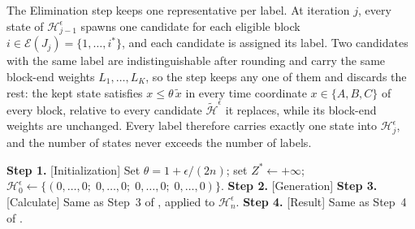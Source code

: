\documentclass[12pt]{article}
\begin{document}
\begin{sloppypar}
The Elimination step keeps one representative per label. At iteration $j$, every state of
$\mathscr{H}^{\epsilon}_{j-1}$ spawns one candidate for each eligible block
$i\in\mathcal{E}(J_j)=\{1,\dots,i^{*}\}$, and each candidate is assigned its label. Two
candidates with the same label are indistinguishable after rounding and carry the same
block-end weights $L_1,\dots,L_K$, so the step keeps any one of them and discards the rest:
the kept state satisfies $x\le\theta\,\tilde x$ in every time coordinate $x\in\{A,B,C\}$ of every
block, relative to every candidate $\tilde{\mathscr{H}}^{\epsilon}$ it replaces, while its
block-end weights are unchanged. Every
label therefore carries exactly one state into $\mathscr{H}^{\epsilon}_{j}$, and the number of
states never exceeds the number of labels.


\begin{algorithm}[tbp]
\small
\linespread{1.2}\selectfont
\SetAlgoLined
\DontPrintSemicolon
\caption{State-class FPTAS for $F2 \parallel W C_{\max}$}\label{alg:fptas}
\BlankLine
\textbf{Step 1.} [Initialization] Set $\theta=1+\epsilon/(2n)$; set $Z^{*}\gets+\infty$; 
			 $\mathscr{H}^{\epsilon}_{0}\gets\{(0,\dots,0; \; 0,\dots,0; \; 0,\dots,0; \; 0,\dots,0)\}$. \;
\textbf{Step 2.} [Generation] 
\textbf{Step 3.} [Calculate] Same as Step~3 of , applied to $\mathscr{H}^{\epsilon}_{n}$. \;
\textbf{Step 4.} [Result] Same as Step~4 of . \;
\end{algorithm}


\end{sloppypar}
\end{document}
